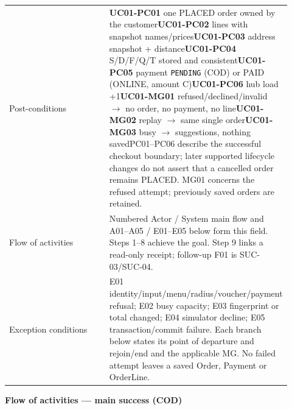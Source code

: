 \begin{longtable}{>{\raggedright\arraybackslash}p{0.4600\linewidth}>{\raggedright\arraybackslash}p{0.4600\linewidth}}
Post-conditions & \textbf{UC01-PC01} one PLACED order owned by the customer\newline{}\textbf{UC01-PC02} lines with snapshot names/prices\newline{}\textbf{UC01-PC03} address snapshot + distance\newline{}\textbf{UC01-PC04} S/D/F/Q/T stored and consistent\newline{}\textbf{UC01-PC05} payment \texttt{PENDING} (COD) or PAID (ONLINE, amount C)\newline{}\textbf{UC01-PC06} hub load +1\newline{}\textbf{UC01-MG01} refused/declined/invalid \ensuremath{\rightarrow} no order, no payment, no line\newline{}\textbf{UC01-MG02} replay \ensuremath{\rightarrow} same single order\newline{}\textbf{UC01-MG03} busy \ensuremath{\rightarrow} suggestions, nothing saved\newline{}PC01--PC06 describe the successful checkout boundary; later supported lifecycle changes do not assert that a cancelled order remains PLACED. MG01 concerns the refused attempt; previously saved orders are retained. \\
Flow of activities & Numbered Actor / System main flow and A01--A05 / E01--E05 below form this field. Steps 1--8 achieve the goal. Step 9 links a read-only receipt; follow-up F01 is SUC-03/SUC-04. \\
Exception conditions & E01 identity/input/menu/radius/voucher/payment refusal; E02 busy capacity; E03 fingerprint or total changed; E04 simulator decline; E05 transaction/commit failure. Each branch below states its point of departure and rejoin/end and the applicable MG. No failed attempt leaves a saved Order, Payment or OrderLine. \\
\end{longtable}
\textbf{Flow of activities --- main success (COD)}

